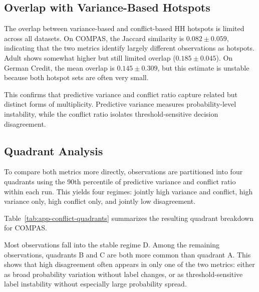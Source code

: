 \subsection{Overlap with Variance-Based Hotspots}
\label{app:conflict-overlap}

The overlap between variance-based and conflict-based HH hotspots is limited across all
datasets. On COMPAS, the Jaccard similarity is $0.082 \pm 0.059$, indicating that the
two metrics identify largely different observations as hotspots. Adult shows somewhat
higher but still limited overlap ($0.185 \pm 0.045$). On German Credit, the mean overlap
is $0.145 \pm 0.309$, but this estimate is unstable because both hotspot sets are often
very small.

This confirms that predictive variance and conflict ratio capture related but distinct
forms of multiplicity. Predictive variance measures probability-level instability, while
the conflict ratio isolates threshold-sensitive decision disagreement.

\subsection{Quadrant Analysis}
\label{app:conflict-quadrants}

To compare both metrics more directly, observations are partitioned into four quadrants
using the 90th percentile of predictive variance and conflict ratio within each run. This
yields four regimes: jointly high variance and conflict, high variance only, high conflict
only, and jointly low disagreement.

Table~\ref{tab:app-conflict-quadrants} summarizes the resulting quadrant breakdown for
COMPAS.

\begin{table}[htbp]
\centering
\caption{Quadrant breakdown for COMPAS (mean $\pm$ standard deviation over 10 runs, 
global top-$K$ ($K=25$)). Thresholds are the 90th percentile of variance and conflict per run.}
\label{tab:app-conflict-quadrants}
\resizebox{\textwidth}{!}{

}
\end{table}

Most observations fall into the stable regime D. Among the remaining observations,
quadrants B and C are both more common than quadrant A. This shows that high
disagreement often appears in only one of the two metrics: either as broad probability
variation without label changes, or as threshold-sensitive label instability without
especially large probability spread.

